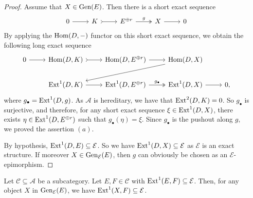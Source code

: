 \begin{proof}
    Assume that $X \in \operatorname{Gen}(E)$.
Then there is a short exact sequence \[\begin{tikzcd}
	0 & K & E^{\oplus r}  & X&  0
	\arrow[from=1-1, to=1-2]
	\arrow[ tail,from=1-2, to=1-3]
	\arrow["g",two heads,from=1-3, to=1-4]
	\arrow[from=1-4, to=1-5]
\end{tikzcd} \] By applying the $\operatorname{Hom}(D,-)$ functor on this short exact sequence, we obtain the following long exact sequence
\[\begin{tikzcd}
	0 & \Hom(D,K) & \Hom(D,E^{\oplus r})  & \Hom(D,X) & \\
     & \Ext^1(D,K) & \Ext^1(D,E^{\oplus r}) & \Ext^1(D,X) & 0,
	\arrow[from=1-1, to=1-2]
	\arrow[tail,from=1-2, to=1-3]
	\arrow[from=1-3, to=1-4]
	\arrow[from=1-4, to=2-2]
    \arrow[from=2-2, to=2-3]
    \arrow[two heads,"g_{\bullet}",from=2-3, to=2-4]
    \arrow[from=2-4, to=2-5]
\end{tikzcd} \] where $g_\bullet = \operatorname{Ext}^1(D,g)$. As $\mathscr{A}$ is hereditary, we have that $\operatorname{Ext}^2(D,K)=0$. So $g_\bullet$ is surjective, and therefore, for any short exact sequence $\xi \in \operatorname{Ext}^1(D,X)$, there exists $\eta  \in \operatorname{Ext}^1(D,E^{\oplus r})$ such that $g_\bullet(\eta) = \xi$. Since $g_\bullet$ is the pushout along $g$, we proved the assertion $(a)$. 

By hypothesis, $\operatorname{Ext}^1(D,E) \subseteq \mathcal{E}$. So we have $\operatorname{Ext}^1(D,X) \subseteq \mathcal{E}$ as $\mathcal{E}$ is an exact structure. If moreover $X \in \operatorname{Gen}_\mathcal{E}(E)$, then $g$ can obviously be chosen as an $\mathcal{E}$-epimorphism. 
\end{proof}

\begin{lemma}
\label{lemma:gendiagram}
Let $\mathscr{C} \subseteq \mathscr{A}$ be a subcategory. Let $E,F \in \mathscr{C}$ with $\operatorname{Ext}^1(E,F) \subseteq \mathcal{E}$. Then, for any object $X$ in $\operatorname{Gen}_\mathcal{E}(E)$, we have $\operatorname{Ext}^1(X,F) \subseteq \mathcal{E}$.  
\end{lemma}

